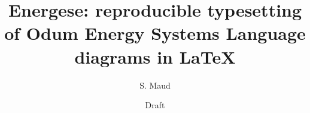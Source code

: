 
\documentclass[11pt,a4paper]{article}
\usepackage[margin=1in]{geometry}
\usepackage{graphicx}
\usepackage{subcaption}
\usepackage{booktabs}
\usepackage{listings}
\usepackage{natbib}
\usepackage{energese}
\usepackage{hyperref}

\graphicspath{{tests/fidelity/out/}{reference-images/}%
              {../tests/fidelity/out/}{../reference-images/}}

\lstset{basicstyle=\ttfamily\footnotesize, columns=fullflexible,
        breaklines=true, frame=single, framesep=4pt, xleftmargin=6pt}

\title{Energese: reproducible typesetting of Odum Energy Systems Language
       diagrams in \LaTeX}
\author{S. Maud}
\date{Draft}


\maketitle

\section{Introduction}

I'm writing some notes on the Odum Energy Systems Language (ESL) and the \texttt{energese} package. Claude LLM is working on the ./article.text as a draft of a paper for submission to \emph{Ecological Modelling}. These notes are intended to be a reference for the article while CLause is working on it. They are not intended to be published, but they may be useful to chat with LLMs. 

